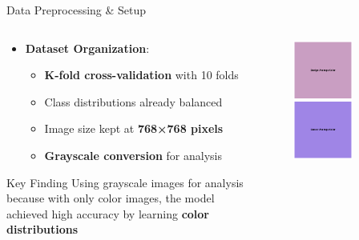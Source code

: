 \documentclass[aspectratio=169,8pt]{beamer}  %
\begin{document}
\begin{frame}{Data Preprocessing \& Setup}
\begin{columns}[T]
\begin{column}{0.6\textwidth}
\begin{itemize}
\item \textbf{Dataset Organization}:
  \begin{itemize}
  \item \textbf{K-fold cross-validation} with 10 folds
  \item Class distributions already balanced
  \item Image size kept at \textbf{768×768 pixels}
  \item \textbf{Grayscale conversion} for analysis
  \end{itemize}
\end{itemize}

\begin{block}{Key Finding}
Using grayscale images for analysis because with only color images, the model achieved high accuracy by learning \textbf{color distributions}
\end{block}
\end{column}
\begin{column}{0.4\textwidth}
\begin{figure}
\includegraphics[width=0.7\textwidth, height=0.70\textheight]{imgs/class_avg_colors.png}
\end{figure}
\end{column}
\end{columns}
\end{frame}
\end{document}
